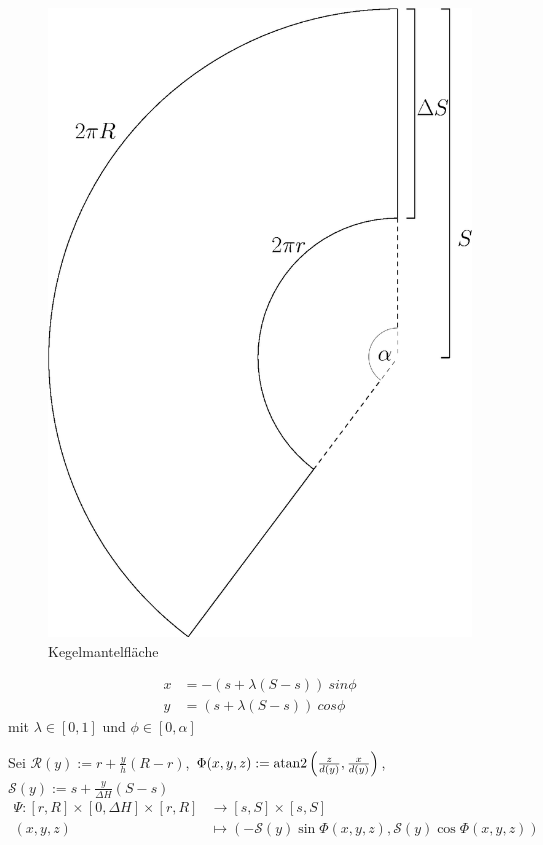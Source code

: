\begin{figure}[!htb]
	\centering
	\includegraphics[scale=.4]{images/coneLateral.eps}
	\caption{Kegelmantelfläche}
	\label{fig:coneLateral}
\end{figure}



\begin{equation}
\begin{aligned}
x &= -(s + \lambda (S-s)) ~sin \phi \\
y &= (s + \lambda (S-s)) ~cos \phi
\end{aligned}
\end{equation}
mit $\lambda \in [0, 1]$ und $\phi \in [0, \alpha]$




Sei $\mathcal{R}(y) := r + \frac{y}{h} (R - r)$, $\Phi(x,y,z) := \text{atan2}\left(\frac{z}{d(y)}, \frac{x}{d(y)}\right)$, $\mathcal{S}(y) := s + \frac{y}{\Delta H} (S-s)$
\begin{equation}
\begin{aligned}
\Psi \colon [r,R] \times [0, \Delta H] \times [r,R] &\to [s,S] \times [s,S]\\
(x,y,z) &\mapsto \left(-\mathcal{S}(y)\sin \Phi(x,y,z), \mathcal{S}(y)\cos\Phi(x,y,z)\right) 
\end{aligned}
\end{equation}

